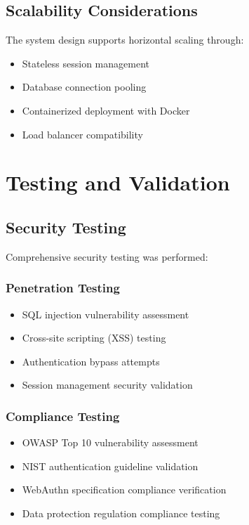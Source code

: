 \documentclass[12pt,a4paper]{article}
\begin{document}
\subsection{Scalability Considerations}
The system design supports horizontal scaling through:
\begin{itemize}
    \item Stateless session management
    \item Database connection pooling
    \item Containerized deployment with Docker
    \item Load balancer compatibility
\end{itemize}

\section{Testing and Validation}

\subsection{Security Testing}
Comprehensive security testing was performed:

\subsubsection{Penetration Testing}
\begin{itemize}
    \item SQL injection vulnerability assessment
    \item Cross-site scripting (XSS) testing
    \item Authentication bypass attempts
    \item Session management security validation
\end{itemize}

\subsubsection{Compliance Testing}
\begin{itemize}
    \item OWASP Top 10 vulnerability assessment
    \item NIST authentication guideline validation
    \item WebAuthn specification compliance verification
    \item Data protection regulation compliance testing
\end{itemize}
\end{document}
